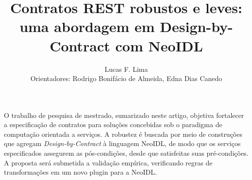 \documentclass[12pt]{article}
\title{Contratos REST robustos e leves:\\uma abordagem em Design-by-Contract
com NeoIDL}
\author{Lucas F. Lima\inst{1}\\Orientadores: Rodrigo Bonifácio de
Almeida\inst{2}, Edna Dias Canedo\inst{1}}
\newcommand{\neoidl}{NeoIDL}
\begin{document}
 

\maketitle

\begin{center}


\end{center}

\begin{resumo} 
  O trabalho de pesquisa de mestrado, sumarizado neste artigo, objetiva
  fortalecer a especificação de contratos para soluções concebidas sob o
  paradigma de computação orientada a serviços. A robustez é buscada por meio de
  construções que agregam \textit{Design-by-Contract} à linguagem \neoidl, de
  modo que os serviços especificados assegurem as pós-condições, desde que
  satisfeitas suas pré-condições.
  A proposta será submetida a validação empírica, verificando regras de
  transformações em um novo plugin para a \neoidl.
\end{resumo}

\newpage





\renewcommand\refname{Referências}


\end{document}
